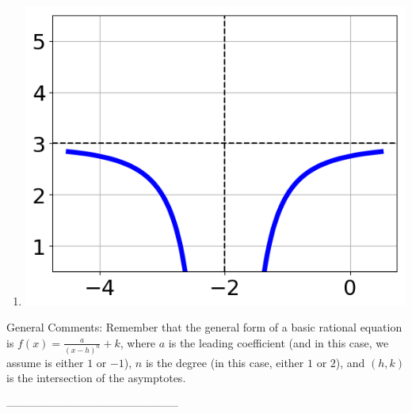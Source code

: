 \documentclass{article}[10pt]
\begin{document}
\begin{enumerate}[label=\Alph*.]
\item  
\begin{center}\includegraphics[scale=0.5]{../Figures/question35MUB.png}\end{center} 
 
\end{enumerate} 
 
General Comments: Remember that the general form of a basic rational equation is $ f(x) = \frac{a}{(x-h)^n} + k$, where $a$ is the leading coefficient (and in this case, we assume is either $1$ or $-1$), $n$ is the degree (in this case, either $1$ or $2$), and $(h, k)$ is the intersection of the asymptotes.

-----------------------------------------------
\end{document}
